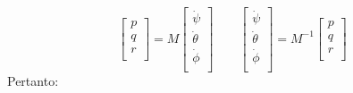 \documentclass[11pt]{report}
\theoremstyle{plain}
\theoremstyle{definition}
\theoremstyle{remark}
\begin{document}
\begin{displaymath}
\left[ \begin{array}{c} p \\ q \\ r \\ \end{array} \right] 
= M 
\left[ \begin{array}{c} \dot{\psi} \\ \dot{\theta} \\ \dot{\phi} \\ \end{array} \right]
\qquad
\left[ \begin{array}{c} \dot{\psi} \\ \dot{\theta} \\ \dot{\phi} \\ \end{array} \right] 
= M^{-1}
\left[ \begin{array}{c} p \\ q \\ r \\ \end{array} \right]
\end{displaymath}
Pertanto:
\end{document}
